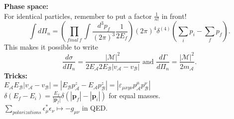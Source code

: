 \documentclass[a4paper, norsk, 8pt, landscape]{article}
\begin{document}
\begin{multicols*}{3}
\resizebox{\columnwidth}{!}{\[
d\Gamma =
\frac{1}{2m_\mathcal{A}}
\left(\prod_f \frac{d^3p_f}{(2\pi)^3}\frac{1}{2E_f}\right)
|\mathcal{M}(p_\mathcal{A}\rightarrow \{p_f\})|^2
(2\pi)^4 \delta^{(4)}(p_\mathcal{A}+p_\mathcal{B}-\sum p_f)
\]}
 {\textbf{Phase space:}} \\
For identical particles, remember to put a factor $\frac{1}{n!}$ in front!
\[
\int d\Pi_n = \left(\prod_{final \ f} \int \frac{d^3 p_f}{(2\pi)^3} \frac{1}{2E_f}\right)
(2\pi)^4 \delta^{(4)}\left(\sum_i p_i - \sum_f p_f\right).
\]
This makes it possible to write
\[
\frac{d\sigma}{d\Pi_n} = \frac{|\mathcal{M}|^2}{2E_\mathcal{A}2E_\mathcal{B}|v_\mathcal{A}-v_\mathcal{B}|}
\text{ and }
\frac{d\Gamma}{d\Pi_n} = \frac{|\mathcal{M}|^2}{2m_\mathcal{A}}.
\]
 {\textbf{Tricks:}} \\
$E_\mathcal{A}E_\mathcal{B}|v_\mathcal{A}-v_\mathcal{B}|
=|E_\mathcal{B}p^z_\mathcal{A}-E_\mathcal{A}p^z_\mathcal{B}|
=|\varepsilon_{\mu x y \nu}p^\mu _\mathcal{A} p^\nu _\mathcal{B}|$ \\
$\delta(E_f-E_i)=\frac{E_f}{|\mathbf{p}_f|}\delta(|\mathbf{p}_f|-|\mathbf{p}_i|)$ for equal masses. \\
$\sum_{polarizations} \epsilon_\mu ^* \epsilon_\nu \mapsto -g_{\mu\nu}$ in QED.













\end{multicols*}
\end{document}
